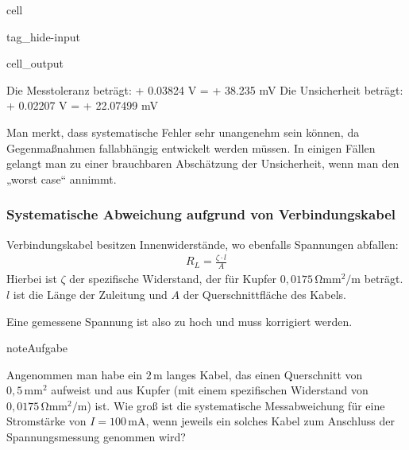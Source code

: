 \documentclass[letterpaper,10pt,english]{jupyterBook}
\begin{document}
\begin{sphinxuseclass}{cell}
\begin{sphinxuseclass}{tag_hide-input}\begin{sphinxVerbatimOutput}

\begin{sphinxuseclass}{cell_output}
\begin{sphinxVerbatim}[commandchars=\\\{\}]
Die Messtoleranz beträgt: +\PYGZhy{} 0.03824 V = +\PYGZhy{} 38.235 mV
Die Unsicherheit beträgt: +\PYGZhy{} 0.02207 V = +\PYGZhy{} 22.07499 mV
\end{sphinxVerbatim}

\end{sphinxuseclass}\end{sphinxVerbatimOutput}

\end{sphinxuseclass}
\end{sphinxuseclass}
\sphinxAtStartPar
Man merkt, dass systematische Fehler sehr unangenehm sein können, da Gegenmaßnahmen fallabhängig entwickelt werden müssen. In einigen Fällen gelangt man zu einer brauchbaren Abschätzung der Unsicherheit, wenn man den „worst case“ annimmt.


\subsubsection{Systematische Abweichung aufgrund von Verbindungskabel}
\label{\detokenize{content/1_Messunsicherheiten:systematische-abweichung-aufgrund-von-verbindungskabel}}
\sphinxAtStartPar
Verbindungskabel besitzen Innenwiderstände, wo ebenfalls Spannungen abfallen:
\begin{equation*}
\begin{split}R_L = \frac{\zeta \cdot l}{A}\end{split}
\end{equation*}
\sphinxAtStartPar
Hierbei ist \(\zeta\) der spezifische Widerstand, der für Kupfer \(0,0175\,\mathrm{\Omega mm^2/m}\) beträgt. \(l\) ist die Länge der Zuleitung und \(A\) der Querschnittfläche des Kabels.

\sphinxAtStartPar
Eine gemessene Spannung ist also zu hoch und muss korrigiert werden.

\begin{sphinxadmonition}{note}{Aufgabe}

\sphinxAtStartPar
Angenommen man habe ein \(2\,\mathrm m\) langes Kabel, das einen Querschnitt von \(0,5\,\mathrm{mm^2}\) aufweist und aus Kupfer (mit einem spezifischen Widerstand von \(0,0175\,\mathrm{\Omega mm^2/m}\)) ist. Wie groß ist die systematische Messabweichung für eine Stromstärke von \(I = 100\,\mathrm{mA}\), wenn jeweils ein solches Kabel zum Anschluss der Spannungsmessung genommen wird?
\end{sphinxadmonition}
\end{document}
